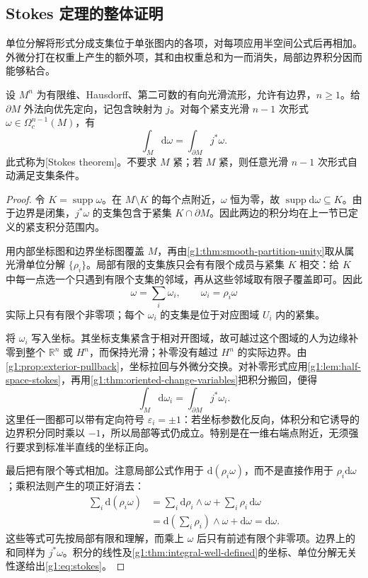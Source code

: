 \subsection{Stokes 定理的整体证明}
\label{g1:subsec:1404:03}

单位分解将形式分成支集位于单张图内的各项，对每项应用半空间公式后再相加。外微分打在权重上产生的额外项，其和由权重总和为一而消失，局部边界积分因而能够粘合。

\begin{theorem}[Stokes 定理]\label{g1:thm:stokes}
	设 \(M^n\) 为有限维、Hausdorff、第二可数的有向光滑流形，允许有边界，\(n\ge1\)。给 \(\partial M\) 外法向优先定向，记包含映射为 \(j\)。对每个紧支光滑 \(n-1\) 次形式 \(\omega\in\Omega_c^{n-1}(M)\)，有
	\begin{equation}\label{g1:eq:stokes}
		\int_M\mathrm{d}\omega=\int_{\partial M}j^*\omega.
	\end{equation}
	此式称为[Stokes theorem]。不要求 \(M\) 紧；若 \(M\) 紧，则任意光滑 \(n-1\) 次形式自动满足支集条件。
\end{theorem}
\begin{proof}
	令 \(K=\operatorname{supp}\omega\)。在 \(M\setminus K\) 的每个点附近，\(\omega\) 恒为零，故 \(\operatorname{supp}\mathrm{d}\omega\subseteq K\)。由于边界是闭集，\(j^*\omega\) 的支集包含于紧集 \(K\cap\partial M\)。因此两边的积分均在上一节已定义的紧支积分范围内。

	用内部坐标图和边界坐标图覆盖 \(M\)，再由\cref{g1:thm:smooth-partition-unity}取从属光滑单位分解 \(\{\rho_i\}\)。局部有限的支集族只会有有限个成员与紧集 \(K\) 相交：给 \(K\) 中每一点选一个只遇到有限个支集的邻域，再从这些邻域取有限子覆盖即可。因此
	\[
		\omega=\sum_i\omega_i,\qquad \omega_i=\rho_i\omega
	\]
	实际上只有有限个非零项；每个 \(\omega_i\) 的支集是位于对应图域 \(U_i\) 内的紧集。

	将 \(\omega_i\) 写入坐标。其坐标支集紧含于相对开图域，故可越过这个图域的人为边缘补零到整个 \(\mathbb R^n\) 或 \(H^n\)，而保持光滑；补零没有越过 \(H^n\) 的实际边界。由\cref{g1:prop:exterior-pullback}，坐标拉回与外微分交换。对补零形式应用\cref{g1:lem:half-space-stokes}，再用\cref{g1:thm:oriented-change-variables}把积分搬回，便得
	\[
		\int_M\mathrm{d}\omega_i=\int_{\partial M}j^*\omega_i.
	\]
	这里任一图都可以带有定向符号 \(\varepsilon_i=\pm1\)：若坐标参数化反向，体积分和它诱导的边界积分同时乘以 \(-1\)，所以局部等式仍成立。特别是在一维右端点附近，无须强行要求到标准半直线的坐标正向。

	最后把有限个等式相加。注意局部公式作用于 \(\mathrm{d}(\rho_i\omega)\)，而不是直接作用于 \(\rho_i\mathrm{d}\omega\)；乘积法则产生的项正好消去：
	\[
		\begin{aligned}
			\sum_i\mathrm{d}(\rho_i\omega)
			&=\sum_i\mathrm{d}\rho_i\wedge\omega+\sum_i\rho_i\,\mathrm{d}\omega\\
			&=\mathrm{d}\!\left(\sum_i\rho_i\right)\wedge\omega+\mathrm{d}\omega
			=\mathrm{d}\omega.
		\end{aligned}
	\]
	这些等式可先按局部有限和理解，而乘上 \(\omega\) 后只有前述有限个非零项。边界上的和同样为 \(j^*\omega\)。积分的线性及\cref{g1:thm:integral-well-defined}的坐标、单位分解无关性遂给出\eqref{g1:eq:stokes}。
\end{proof}

